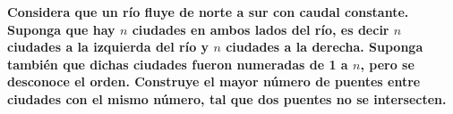 \textbf{Considera que un r\'io fluye de norte a sur con caudal constante. Suponga que hay $n$ ciudades en ambos lados del r\'io, es decir $n$ ciudades a la izquierda del r\'io y $n$ ciudades a la derecha. Suponga tambi\'en que dichas ciudades fueron numeradas de 1 a $n$, pero se desconoce el orden. Construye el mayor n\'umero de puentes entre ciudades con el mismo n\'umero, tal que dos puentes no se intersecten.}\vspace{.2cm}

\textcolor{bibi}{}
\begin{quote}
\end{quote}